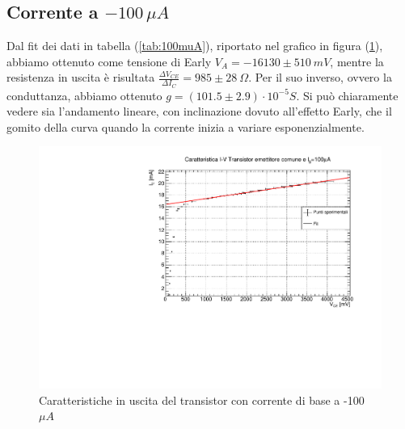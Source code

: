 \documentclass[]{article}
\begin{document}
\subsection{Corrente a $ -100\,\mu A $}
Dal fit dei dati in tabella (\ref{tab:100muA}), riportato nel grafico in figura (\ref{fig:corrente 100}), abbiamo ottenuto come tensione di Early $ V_{A}=-16130\pm510\ mV $, mentre la resistenza in uscita è risultata $ \frac{\Delta V_{CE}}{\Delta I _{C}}=985\pm28\ \Omega$. Per il suo inverso, ovvero la conduttanza, abbiamo ottenuto $ g=(101.5\pm2.9)\cdot 10^{-5} S $. Si può chiaramente vedere sia l'andamento lineare, con inclinazione dovuto all'effetto Early, che il gomito della curva quando la corrente inizia a variare esponenzialmente.
	\begin{figure}[H]
		\centering
		\includegraphics[width=0.9\linewidth]{../100 muA/c1}
		\caption{Caratteristiche in uscita del transistor con corrente di base a -100 $ \mu A $}
		\label{fig:corrente 100}
	\end{figure}
\end{document}
